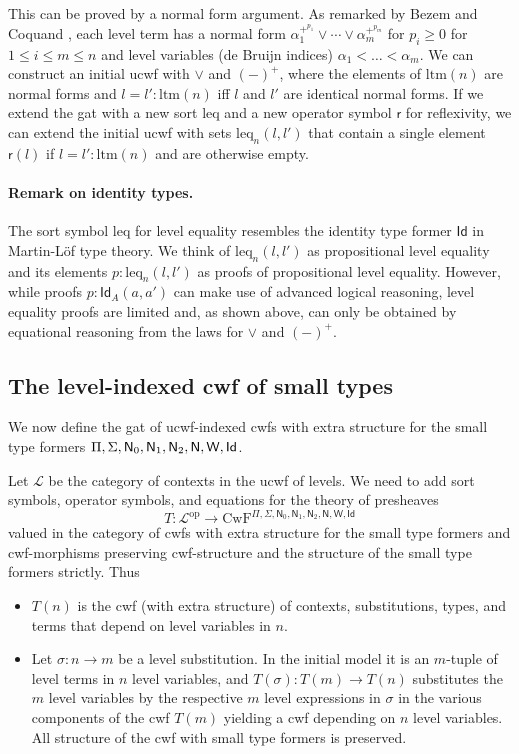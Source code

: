 \documentclass[submission,copyright,creativecommons]{eptcs}
\newcommand{\ERASER}[1]{}
\newcommand{\Id}{\mathsf{Id}}
\newcommand{\refl}{\mathsf{r}}
\newcommand{\N}{\mathsf{N}}
\def\ltm{\mathrm{ltm}}
\def\leq{\mathrm{leq}}
\def\L{{\mathcal{L}}}
\def\CwF{\mathrm{CwF}}
\def\W{\mathsf{W}}
\begin{document}
This can be proved by a normal form argument. As remarked by Bezem and Coquand \cite{bezem-coquand:lattices},
each level term has a normal form
$
\alpha_1^{+^{p_1}} \vee \cdots \vee \alpha_m^{+^{p_m}}
$
for $p_i \geq 0$ for $1 \le i \le m \le n$ and level variables (de Bruijn indices) $\alpha_1 < \ldots < \alpha_m$.
We can construct an initial ucwf with $\vee$ and $(-)^+$, where the elements of $\ltm(n)$ are normal forms and $l = l' : \ltm(n)$ iff $l$ and $l'$ are identical normal forms.  If we extend the gat with a new sort $\leq$ and a new operator symbol $\refl$ for reflexivity, we can extend the initial ucwf with sets $\leq_n(l,l')$ that contain a single element $\refl(l)$ if $l = l' : \ltm(n)$ and are otherwise empty.

\paragraph{Remark on identity types.} The sort symbol $\leq$ for level equality resembles the identity type former $\Id$ in Martin-Löf type theory. We think of $\leq_n(l,l')$ as propositional level equality and its elements $p : \leq_n(l,l')$ as proofs of propositional level equality. However, while proofs $p : \Id_A(a,a')$ can make use of advanced logical reasoning, level equality proofs are limited and, as shown above, can only be obtained by equational reasoning from the laws for $\vee$ and $(-)^+$.


\ERASER{TC: Remark on finitely presented semilattices and constraints?}


\subsection{The level-indexed cwf of small types}\label{lcwf-sort}

We now define the gat of ucwf-indexed cwfs with extra structure for the small type formers $\Pi,\Sigma,\N_0,\N_1,\newline \N_2,\N,\W,\Id$.

Let $\L$ be the category of contexts in the ucwf of levels. We need to add sort symbols, operator symbols, and equations for the theory of presheaves
$$
T : \L^\mathrm{op} \to \CwF^{\Pi,\Sigma,\N_0,\N_1,\N_2,\N,\W,\Id}
$$
valued in the category of cwfs with extra structure for the small type formers and cwf-morphisms preserving cwf-structure and the structure of the small type formers strictly. Thus
\begin{itemize}
\item
$T(n)$ is the cwf (with extra structure) of contexts, substitutions, types, and terms that depend on level variables in $n$.
\item
Let $\sigma : n \to m$ be a level substitution. In the initial model it is an $m$-tuple of level terms in $n$ level variables, and
$T(\sigma) : T(m) \to T(n)$ substitutes the $m$ level variables by the respective $m$ level expressions in $\sigma$ in the various components of the cwf $T(m)$ yielding a cwf depending on $n$ level variables. All structure of the cwf with small type formers is preserved.
\end{itemize}
\end{document}
